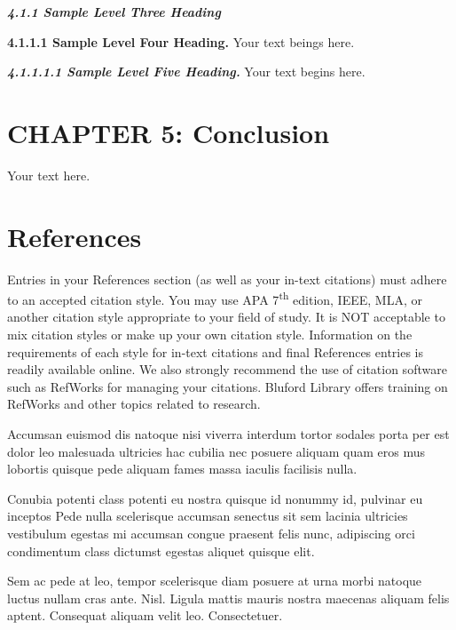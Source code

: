 \protect\hypertarget{_Toc114562031}{}{}\emph{\textbf{4.1.1 Sample Level
Three Heading}}

\protect\hypertarget{_Toc114562032}{}{}\textbf{4.1.1.1 Sample Level Four
Heading.} Your text beings here.

\protect\hypertarget{_Toc114562033}{}{}\emph{\textbf{4.1.1.1.1 Sample
Level Five Heading.}} Your text begins here.

\hypertarget{chapter-5-conclusion}{%
\section{CHAPTER 5: Conclusion}\label{chapter-5-conclusion}}

Your text here.

\hypertarget{references}{%
\section{\texorpdfstring{\hfill\break
References}{ References}}\label{references}}

Entries in your References section (as well as your in-text citations)
must adhere to an accepted citation style. You may use APA
7\textsuperscript{th} edition, IEEE, MLA, or another citation style
appropriate to your field of study. It is NOT acceptable to mix citation
styles or make up your own citation style. Information on the
requirements of each style for in-text citations and final References
entries is readily available online. We also strongly recommend the use
of citation software such as RefWorks for managing your citations.
Bluford Library offers training on RefWorks and other topics related to
research.

Accumsan euismod dis natoque nisi viverra interdum tortor sodales porta
per est dolor leo malesuada ultricies hac cubilia nec posuere aliquam
quam eros mus lobortis quisque pede aliquam fames massa iaculis
facilisis nulla.

Conubia potenti class potenti eu nostra quisque id nonummy id, pulvinar
eu inceptos Pede nulla scelerisque accumsan senectus sit sem lacinia
ultricies vestibulum egestas mi accumsan congue praesent felis nunc,
adipiscing orci condimentum class dictumst egestas aliquet quisque elit.

Sem ac pede at leo, tempor scelerisque diam posuere at urna morbi
natoque luctus nullam cras ante. Nisl. Ligula mattis mauris nostra
maecenas aliquam felis aptent. Consequat aliquam velit leo.
Consectetuer.

